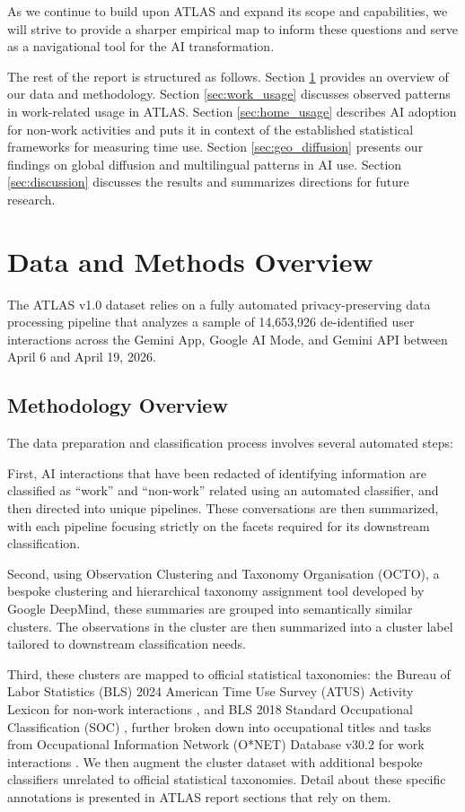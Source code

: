 \documentclass[11pt,a4paper]{article}
\begin{document}
As we continue to build upon ATLAS and expand its scope and capabilities, we will strive to provide a sharper empirical map to inform these questions and serve as a navigational tool for the AI transformation. 

The rest of the report is structured as follows.  Section \ref{sec:data_methods} provides an overview of our data and methodology. Section \ref{sec:work_usage} discusses  observed patterns in work-related usage in ATLAS. Section \ref{sec:home_usage} describes AI adoption for non-work activities and puts it in context of the established statistical frameworks for measuring time use. Section \ref{sec:geo_diffusion} presents our findings on global diffusion and multilingual patterns in AI use. Section \ref{sec:discussion} discusses the results and summarizes directions for future research.

\section{Data and Methods Overview}\label{sec:data_methods}

The ATLAS v1.0 dataset relies on a fully automated privacy-preserving data processing pipeline that analyzes a sample of 14,653,926 de-identified user interactions across the Gemini App, Google AI Mode, and Gemini API between April 6 and April 19, 2026.

\subsection{Methodology Overview}\label{subsec:methodology_overview}

The data preparation and classification process involves several automated steps:

First, AI interactions that have been redacted of identifying information are classified as ``work'' and ``non-work'' related using an automated classifier, and then directed into unique pipelines. These conversations are then summarized, with each pipeline focusing strictly on the facets required for its downstream classification.

Second, using Observation Clustering and Taxonomy Organisation (OCTO), a bespoke clustering and hierarchical taxonomy assignment tool developed by Google DeepMind, these summaries are grouped into semantically similar clusters. The observations in the cluster are then summarized into a cluster label tailored to downstream classification needs.

Third, these clusters are mapped to official statistical taxonomies: the Bureau of Labor Statistics (BLS) 2024 American Time Use Survey (ATUS) Activity Lexicon for non-work interactions \citep{bls_atus_lexicon_2024}, and BLS 2018 Standard Occupational Classification (SOC) \citep{bls_soc_2018}, further broken down into occupational titles and tasks from Occupational Information Network (O*NET) Database v30.2 for work interactions \citep{onet_30_2}. We then augment the cluster dataset with additional bespoke classifiers unrelated to official statistical taxonomies. Detail about these specific annotations is presented in ATLAS report sections that rely on them.
\end{document}
